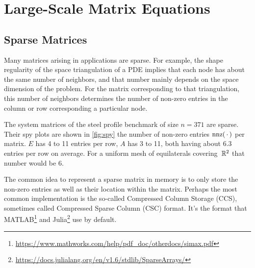\chapter{Large-Scale Matrix Equations}

\section{Sparse Matrices}

Many matrices arising in applications are sparse.
For example, the shape regularity of the space triangulation of a \ac{PDE}
implies that each node has about the same number of neighbors,
and that number mainly depends on the space dimension of the problem.
For the matrix corresponding to that triangulation,
this number of neighbors determines the number of non-zero entries in the column or row corresponding a particular node.

\begin{example}
  The system matrices of the steel profile benchmark \cite{morwiki_steel} of size $n=371$ are sparse.
  Their spy plots are shown in \autoref{fig:spy} the number of non-zero entries $\nnz(\optional{})$ per matrix.
  $E$ has 4 to 11 entries per row, $A$ has 3 to 11, both having about \num{6.3} entries per row on average.
  For a uniform mesh of equilaterals covering~$\mathbb{R}^2$ that number would be \num{6}.
\end{example}

The common idea to represent a sparse matrix in memory is to only store the non-zero entries as well as their location within the matrix.
Perhaps the most common implementation is the so-called Compressed Column Storage (CCS),
sometimes called Compressed Sparse Column (CSC) format.
It's the format that \eg MATLAB\footnote{\url{https://www.mathworks.com/help/pdf_doc/otherdocs/simax.pdf}}
and Julia\footnote{\url{https://docs.julialang.org/en/v1.6/stdlib/SparseArrays/}} use by default.

